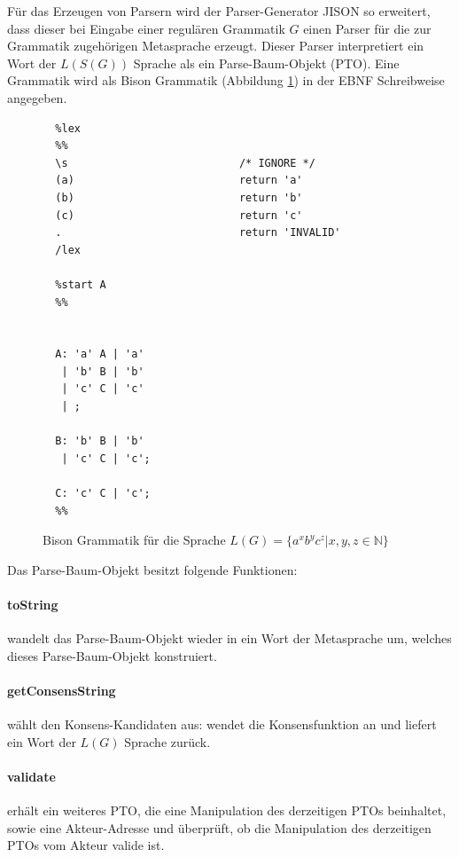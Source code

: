 \documentclass[a4paper,12pt]{report}
\begin{document}
Für das Erzeugen von Parsern wird der Parser-Generator JISON so erweitert, dass dieser bei Eingabe einer regulären Grammatik $G$ einen Parser für die zur Grammatik zugehörigen Metasprache erzeugt. Dieser Parser interpretiert ein Wort der $L(S(G))$ Sprache als ein Parse-Baum-Objekt (PTO). Eine Grammatik wird als Bison Grammatik (Abbildung \ref{bisongrammar}) in der EBNF Schreibweise angegeben.

\begin{figure}[ht]
  \centering
  \begin{lstlisting}
  %lex
  %%
  \s                           /* IGNORE */
  (a)                          return 'a'
  (b)                          return 'b'
  (c)                          return 'c'
  .                            return 'INVALID'
  /lex

  %start A
  %% 


  A: 'a' A | 'a'
   | 'b' B | 'b'
   | 'c' C | 'c'
   | ;

  B: 'b' B | 'b'
   | 'c' C | 'c';

  C: 'c' C | 'c';
  %%
  \end{lstlisting}
  \caption{ Bison Grammatik für die Sprache $L(G) = \{ a^xb^yc^z | x,y,z\in \mathbb{N} \}$ }
  \label{bisongrammar}
\end{figure}

Das Parse-Baum-Objekt besitzt folgende Funktionen:

\paragraph*{toString}
wandelt das Parse-Baum-Objekt wieder in ein Wort der Metasprache um, welches dieses Parse-Baum-Objekt konstruiert.

\paragraph*{getConsensString}
wählt den Konsens-Kandidaten aus:
wendet die Konsensfunktion an und liefert ein Wort der $L(G)$ Sprache zurück.

\paragraph*{validate}
erhält ein weiteres PTO, die eine Manipulation des derzeitigen PTOs beinhaltet, sowie eine Akteur-Adresse und überprüft, ob die Manipulation des derzeitigen PTOs vom Akteur valide ist.
\end{document}
